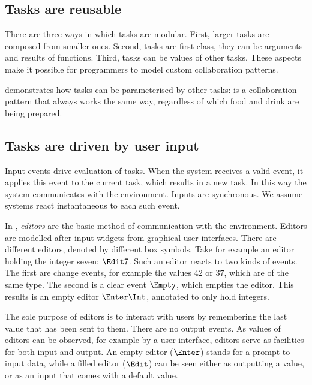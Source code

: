 \subsection{Tasks are reusable}

There are three ways in which tasks are modular.
First, larger tasks are composed from smaller ones.
Second, tasks are first-class, they can be arguments and results of functions.
Third, tasks can be values of other tasks.
These aspects make it possible for programmers to model custom collaboration patterns.

 demonstrates how tasks can be parameterised by other tasks:  is a collaboration pattern that always works the same way, regardless of which food and drink are being prepared.



\subsection{Tasks are driven by user input}

Input events drive evaluation of tasks.
When the system receives a valid event, it applies this event to the current task, which results in a new task.
In this way the system communicates with the environment.
Inputs are synchronous.
We assume systems react instantaneous to each such event.

In \TOPHAT, \emph{editors} are the basic method of communication with the environment.
Editors are modelled after input widgets from graphical user interfaces.
There are different editors, denoted by different box symbols.
Take for example an editor holding the integer seven: $\Edit 7$.
Such an editor reacts to two kinds of events.
The first are change events, for example the values $42$ or $37$, which are of the same type.
The second is a clear event $\Empty$, which empties the editor.
This results is an empty editor $\Enter \Int$, annotated to only hold integers.


The sole purpose of editors is to interact with users by remembering the last value that has been sent to them.
There are no output events.
As values of editors can be observed, for example by a user interface, editors serve as facilities for both input and output.
An empty editor ($\Enter$) stands for a prompt to input data,
while a filled editor ($\Edit$) can be seen either as outputting a value, or as an input that comes with a default value.



